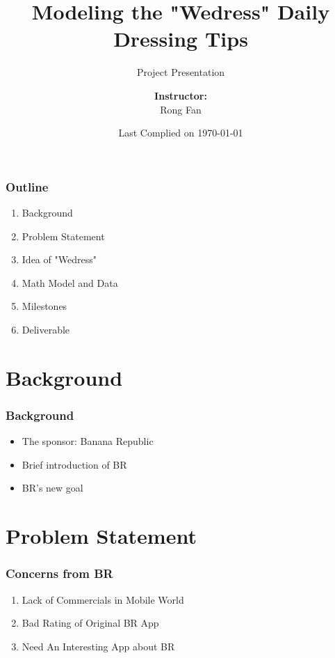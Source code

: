 \documentclass[compress,handout,10pt]{beamer}
\title{{\color{blue} \LARGE Modeling the "Wedress" Daily Dressing Tips\newline} }
\subtitle{{\color{red} \large Project Presentation} }
\author{ 
    {\bf{Instructor:}} \\ 
Rong Fan \\ 
    \vspace{5pt}
}
\institute{JHU AMS 2012 FALL}
\date{\mygreen Last Complied on \today}
\let\olditem\item
\renewcommand{\item}{\setlength{\itemsep}{0.5\baselineskip}\olditem}
\begin{document}
\begin{frame}[plain]
    \titlepage
\end{frame}

\begin{frame}
    \frametitle{Outline}
              \begin{enumerate}
                 \item Background
                 \item Problem Statement
                 \item Idea of "Wedress"
                 \item Math Model and Data
                 \item Milestones
                 \item Deliverable
             \end{enumerate}
\end{frame}

\section{Background}

\begin{frame}
    \frametitle{Background}
    \vspace{7pt}
             \begin{itemize}
                 \item \large The sponsor: Banana Republic
                 \item Brief introduction of BR
                 \item BR's new goal
             \end{itemize}
\end{frame}



\section{Problem Statement}
\begin{frame}
    \frametitle{Concerns from BR}
     \begin{enumerate}
         \item \large Lack of Commercials in Mobile World 
         \item Bad Rating of Original BR App
         \item Need An Interesting App about BR
     \end{enumerate}
\end{frame}
\end{document}
